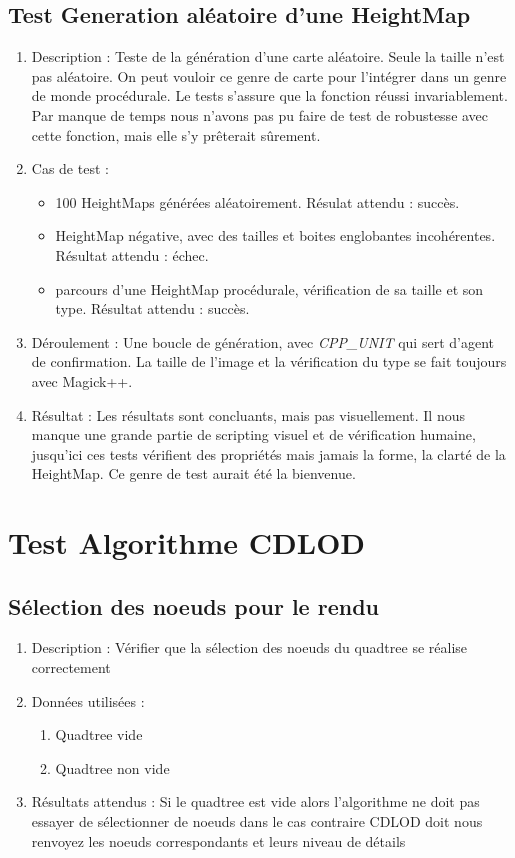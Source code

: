 \documentclass[12pt]{report}
\begin{document}
\subsection{Test Generation aléatoire d'une HeightMap}
\begin{enumerate}
    \item Description : Teste de la génération d'une carte aléatoire. Seule la taille n'est pas aléatoire. On peut vouloir ce genre de carte pour l'intégrer dans un genre de monde procédurale. Le tests s'assure que la fonction réussi invariablement. Par manque de temps nous n'avons pas pu faire de test de robustesse avec cette fonction, mais elle s'y prêterait sûrement.
    \item Cas de test : 
    \begin{itemize}
        \item 100 HeightMaps générées aléatoirement. Résulat attendu : succès.
        \item HeightMap négative, avec des tailles et boites englobantes incohérentes. Résultat attendu : échec.
        \item parcours d'une HeightMap procédurale, vérification de sa taille et son type. Résultat attendu : succès.
    \end{itemize}
    \item Déroulement : Une boucle de génération, avec \emph{CPP\_UNIT} qui sert d'agent de confirmation. La taille de l'image et la vérification du type se fait toujours avec Magick++.
    \item Résultat : Les résultats sont concluants, mais pas visuellement. Il nous manque une grande partie de scripting visuel et de vérification humaine, jusqu'ici ces tests vérifient des propriétés mais jamais la forme, la clarté de la HeightMap. Ce genre de test aurait été la bienvenue.
\end{enumerate}

\section{Test Algorithme CDLOD}

\subsection{Sélection des noeuds pour le rendu}
\begin{enumerate}
    \item Description : Vérifier que la sélection des noeuds du quadtree se réalise correctement 
    \item Données utilisées :
    \begin{enumerate}
        \item Quadtree vide
        \item Quadtree non vide
    \end{enumerate}
    \item Résultats attendus : Si le quadtree est vide alors l'algorithme ne doit pas essayer de sélectionner de noeuds dans le cas contraire CDLOD doit nous renvoyez les noeuds correspondants et leurs niveau de détails
\end{enumerate}
\end{document}
